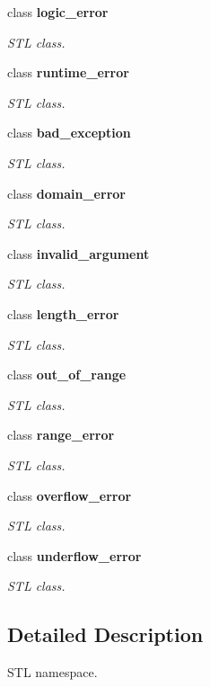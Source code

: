 \begin{DoxyCompactItemize}
class {\bfseries logic\_\-error}
\begin{DoxyCompactList}\small\item\em STL class. \item\end{DoxyCompactList}\item 
class {\bfseries runtime\_\-error}
\begin{DoxyCompactList}\small\item\em STL class. \item\end{DoxyCompactList}\item 
class {\bfseries bad\_\-exception}
\begin{DoxyCompactList}\small\item\em STL class. \item\end{DoxyCompactList}\item 
class {\bfseries domain\_\-error}
\begin{DoxyCompactList}\small\item\em STL class. \item\end{DoxyCompactList}\item 
class {\bfseries invalid\_\-argument}
\begin{DoxyCompactList}\small\item\em STL class. \item\end{DoxyCompactList}\item 
class {\bfseries length\_\-error}
\begin{DoxyCompactList}\small\item\em STL class. \item\end{DoxyCompactList}\item 
class {\bfseries out\_\-of\_\-range}
\begin{DoxyCompactList}\small\item\em STL class. \item\end{DoxyCompactList}\item 
class {\bfseries range\_\-error}
\begin{DoxyCompactList}\small\item\em STL class. \item\end{DoxyCompactList}\item 
class {\bfseries overflow\_\-error}
\begin{DoxyCompactList}\small\item\em STL class. \item\end{DoxyCompactList}\item 
class {\bfseries underflow\_\-error}
\begin{DoxyCompactList}\small\item\em STL class. \item\end{DoxyCompactList}\end{DoxyCompactItemize}


\subsection{Detailed Description}
STL namespace. 